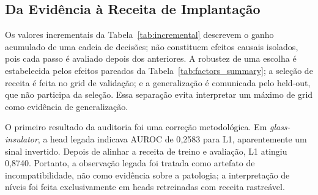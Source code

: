 \documentclass[conference]{IEEEtran}
\begin{document}
\subsection{Da Evidência à Receita de Implantação}
\label{sec:decision_trace}

Os valores incrementais da Tabela~\ref{tab:incremental} descrevem o ganho acumulado de uma cadeia de decisões; não constituem efeitos causais isolados, pois cada passo é avaliado depois dos anteriores. A robustez de uma escolha é estabelecida pelos efeitos pareados da Tabela~\ref{tab:factors_summary}; a seleção de receita é feita no grid de validação; e a generalização é comunicada pelo held-out, que não participa da seleção. Essa separação evita interpretar um máximo de grid como evidência de generalização.

O primeiro resultado da auditoria foi uma correção metodológica. Em \textit{glass-insulator}, a head legada indicava AUROC de 0{,}2583 para L1, aparentemente um sinal invertido. Depois de alinhar a receita de treino e avaliação, L1 atingiu 0{,}8740. Portanto, a observação legada foi tratada como artefato de incompatibilidade, não como evidência sobre a patologia; a interpretação de níveis foi feita exclusivamente em heads retreinadas com receita rastreável.
\end{document}
